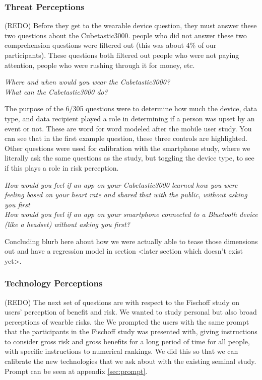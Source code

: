 \documentclass{acm_proc_article-sp}
\begin{document}
\subsubsection{Threat Perceptions}
(REDO) Before they get to the wearable device question, they must answer these two questions about the Cubetastic3000. people who did not answer these two comprehension questions were filtered out (this was about 4\% of our participants). These questions both filtered out people who were not paying attention, people who were rushing through it for money, etc. 

\textit{Where and when would you wear the Cubetastic3000?}\\[-.5cm]

\textit{What can the Cubetastic3000 do?} 


The purpose of the 6/305 questions were to determine how much the device, data type, and data recipient played a role in determining if a person was upset by an event or not. These are word for word modeled after the mobile user study. You can see that in the first example question, these three controls are highlighted. Other questions were used for calibration with the smartphone study, where we literally ask the same questions as the study, but toggling the device type, to see if this plays a role in risk perception.

\textit{How would you feel if an app on your Cubetastic3000 learned how you were feeling based on your heart rate and shared that with the public, without asking you first}\\[-.5cm]

\textit{How would you feel if an app on your smartphone connected to a Bluetooth device (like a headset) without asking you first?} 

Concluding blurb here about how we were actually able to tease those dimensions out and have a regression model in section <later section which doesn't exist yet>.  

\subsubsection{Technology Perceptions}
(REDO) The next set of questions are with respect to the Fischoff study on users’ perception of benefit and risk. We wanted to study personal but also broad perceptions of wearble risks. the We prompted the users with the same prompt that the participants in the Fischoff study was presented with, giving instructions to consider gross risk and gross benefits for a long period of time for all people, with specific instructions to numerical rankings. We did this so that we can calibrate the new technologies that we ask about with the existing seminal study. Prompt can be seen at appendix \ref{sec:prompt}. 
\end{document}
